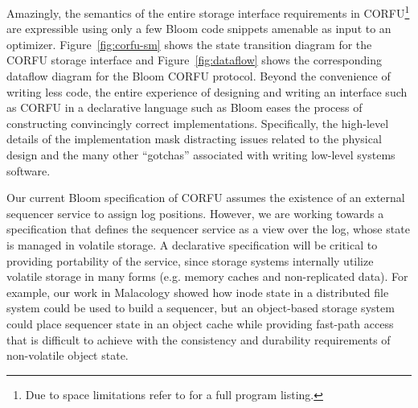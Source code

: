 Amazingly, the semantics of the entire storage interface requirements in
CORFU\footnote{Due to space limitations refer to \cite{watkins:ucsc-soe-16-12}
for a full program listing.} are expressible using only a few Bloom code
snippets amenable as input to an optimizer.  Figure~\ref{fig:corfu-sm}
shows the state transition diagram for the CORFU storage interface and
Figure~\ref{fig:dataflow} shows the corresponding dataflow diagram for the
Bloom CORFU protocol. Beyond the convenience of writing less code, the
entire experience of designing and writing an interface such as CORFU in a
declarative language such as Bloom eases the process of constructing
convincingly correct implementations. Specifically, the high-level details
of the implementation mask distracting issues related to the physical
design and the many other ``gotchas'' associated with writing low-level
systems software.

Our current Bloom specification of CORFU assumes the existence of
an external sequencer service to assign log positions. However, we are working
towards a specification that defines the sequencer service as a view over the
log, whose state is managed in volatile storage. A declarative specification
will be critical to providing portability of the service, since storage
systems internally utilize volatile storage in many forms (e.g. memory caches
and non-replicated data). For example, our work in Malacology showed how inode state in a
distributed file system could be used to build a sequencer,
but an object-based storage system could place sequencer
state in an object cache while providing fast-path access that is difficult to
achieve with the consistency and durability requirements of non-volatile
object state.




